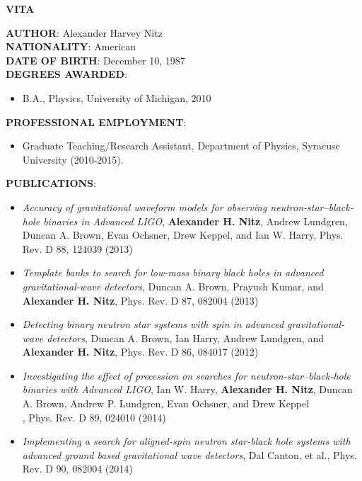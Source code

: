 \thispagestyle{empty}
\begin{center}
{\large {\bf VITA}}
\end{center}
\vspace{1cm}
{\bf AUTHOR}: Alexander Harvey Nitz \\
{\bf NATIONALITY}: American \\
{\bf DATE OF BIRTH}: December 10, 1987 \\
{\bf DEGREES AWARDED}:
\begin{itemize}
\item B.A., Physics, University of Michigan, 2010
\end{itemize}
{\bf PROFESSIONAL EMPLOYMENT}:
\begin{itemize}
\item[] Graduate Teaching/Research Assistant, Department of Physics, Syracuse University (2010-2015).
\end{itemize}
{\bf PUBLICATIONS}:
\begin{itemize}
\item \textit{Accuracy of gravitational waveform models for observing neutron-star–black-hole binaries in Advanced LIGO}, \textbf{Alexander H. Nitz}, Andrew Lundgren, Duncan A. Brown, Evan Ochsner, Drew Keppel, and Ian W. Harry, Phys. Rev. D 88, 124039 (2013)
\item \textit{Template banks to search for low-mass binary black holes in advanced gravitational-wave detectors}, Duncan A. Brown, Prayush Kumar, and \textbf{Alexander H. Nitz}, Phys. Rev. D 87, 082004 (2013)
\item \textit{Detecting binary neutron star systems with spin in advanced gravitational-wave detectors}, Duncan A. Brown, Ian Harry, Andrew Lundgren, and \textbf{Alexander H. Nitz}, Phys. Rev. D 86, 084017 (2012)
\item \textit{Investigating the effect of precession on searches for neutron-star–black-hole binaries with Advanced LIGO}, Ian W. Harry, \textbf{Alexander H. Nitz}, Duncan A. Brown, Andrew P. Lundgren, Evan Ochsner, and Drew Keppel\\, Phys. Rev. D 89, 024010 (2014)
\item \textit{Implementing a search for aligned-spin neutron star-black hole systems with advanced ground based gravitational wave detectors}, Dal Canton, et al., Phys. Rev. D 90, 082004 (2014)

\end{itemize}
